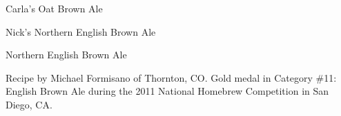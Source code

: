 \begin{recipe}{Carla's Oat Brown Ale}
\begin{recipe}{Nick's Northern English Brown Ale}
\begin{ingredientsblock}

\end{ingredientsblock}

\end{recipe}

\begin{recipe}{Northern English Brown Ale}

\begin{aboutblock}
Recipe by Michael Formisano of Thornton, CO. Gold medal in Category \#11: English
Brown Ale during the 2011 National Homebrew Competition in San Diego, CA.
\sourceaha
\end{aboutblock}


\begin{methodandtiming}

\begin{mashsteps}
\end{mashsteps}

\begin{fermentationsteps}
\end{fermentationsteps}

\end{methodandtiming}

\recipebreak

\begin{ingredientsblock}

\begin{malts}
\end{malts}

\begin{hops}
\end{hops}


\end{ingredientsblock}
\end{recipe}
\end{recipe}
